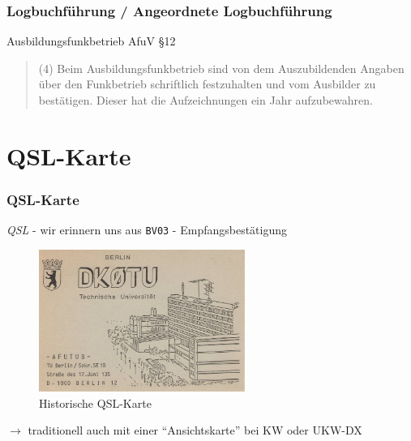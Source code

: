 \begin{frame}
  \frametitle{Logbuchführung / Angeordnete Logbuchführung}

  \begin{exampleblock}{Ausbildungsfunkbetrieb}
    AfuV §12
    \begin{quote}
      (4) Beim Ausbildungsfunkbetrieb sind von dem Auszubildenden Angaben über den Funkbetrieb schriftlich festzuhalten und vom Ausbilder zu bestätigen. Dieser hat die Aufzeichnungen ein Jahr aufzubewahren.
    \end{quote}
  \end{exampleblock}
\end{frame}


\section{QSL-Karte}

\begin{frame}
  \frametitle{QSL-Karte}

  \emph{QSL} - wir erinnern uns aus \texttt{BV03} - Empfangsbestätigung \\[1em]

  \begin{center}
    \begin{figure}
      \includegraphics[width=0.6\textwidth,height=.6\textheight,keepaspectratio]{bv13/DK0TU_1.jpg}
      \caption{Historische QSL-Karte}
    \end{figure}
  \end{center}

  $\rightarrow$ traditionell auch mit einer ``Ansichtskarte'' bei KW oder UKW-DX

\end{frame}

